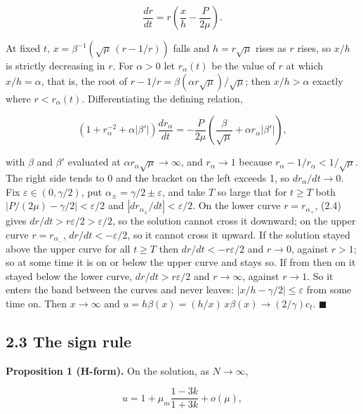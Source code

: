 \documentclass[11pt,a4paper]{article}
\begin{document}
\begin{equation*}
\frac{dr}{dt} = r\left(\frac{x}{h} - \frac{P}{2\mu}\right). \tag{2.4}
\end{equation*}


At fixed $t$, $x = \beta^{-1}(\sqrt\mu\,(r - 1/r))$ falls and $h = r\sqrt\mu$ rises as $r$ rises, so $x/h$ is strictly
decreasing in $r$. For $\alpha > 0$ let $r_\alpha(t)$ be the value of $r$ at which $x/h = \alpha$, that is, the root of
$r - 1/r = \beta(\alpha r\sqrt\mu)/\sqrt\mu$; then $x/h > \alpha$ exactly where $r < r_\alpha(t)$. Differentiating the defining
relation,


\begin{equation*}
\left(1 + r_\alpha^{-2} + \alpha|\beta'|\right)\frac{dr_\alpha}{dt} = -\frac{P}{2\mu}\left(\frac{\beta}{\sqrt\mu} + \alpha r_\alpha|\beta'|\right),
\end{equation*}


with $\beta$ and $\beta'$ evaluated at $\alpha r_\alpha\sqrt\mu \to \infty$, and $r_\alpha \to 1$ because
$r_\alpha - 1/r_\alpha < 1/\sqrt\mu$. The right side tends to 0 and the bracket on the left
exceeds 1, so $dr_\alpha/dt \to 0$. Fix $\varepsilon \in (0, \gamma/2)$, put $\alpha_\pm = \gamma/2 \pm \varepsilon$, and take $T$ so large
that for $t \ge T$ both $|P/(2\mu) - \gamma/2| < \varepsilon/2$ and $|dr_{\alpha_\pm}/dt| < \varepsilon/2$. On the lower curve $r = r_{\alpha_+}$,
(2.4) gives $dr/dt > r\varepsilon/2 > \varepsilon/2$, so the solution cannot cross it downward; on the upper curve $r = r_{\alpha_-}$,
$dr/dt < -\varepsilon/2$, so it cannot cross it upward. If the solution stayed above the upper curve for all $t \ge T$ then
$dr/dt < -r\varepsilon/2$ and $r \to 0$, against $r > 1$; so at some time it is on or below the upper curve and stays so.
If from then on it stayed below the lower curve, $dr/dt > r\varepsilon/2$ and $r \to \infty$, against $r \to 1$. So it enters
the band between the curves and never leaves: $|x/h - \gamma/2| \le \varepsilon$ from some time on. Then
$x \to \infty$ and $u = h\beta(x) = (h/x)\,x\beta(x) \to (2/\gamma)c_t$. \hfill$\blacksquare$


\subsection*{2.3 The sign rule}
{\bfseries\boldmath Proposition 1 (H-form).} On the solution, as $N \to \infty$,


\begin{equation*}
u = 1 + \mu_m\frac{1 - 3k}{1 + 3k} + o(\mu),
\end{equation*}
\end{document}
